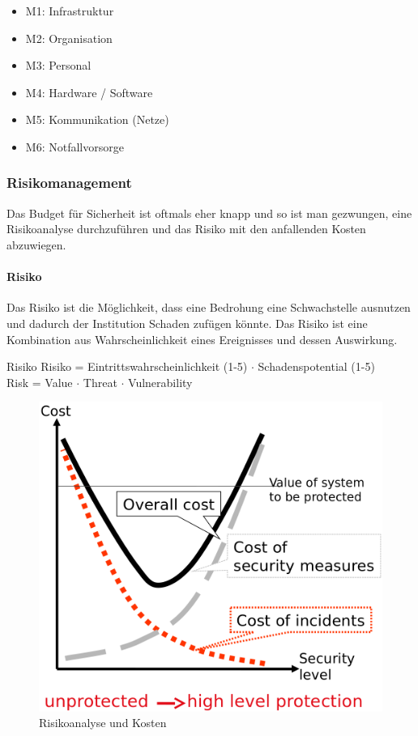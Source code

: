 \begin{itemize}
	\item M1: Infrastruktur
	\item M2: Organisation
	\item M3: Personal
	\item M4: Hardware / Software
	\item M5: Kommunikation (Netze)
	\item M6: Notfallvorsorge
\end{itemize}

\subsubsection{Risikomanagement}

Das Budget für Sicherheit ist oftmals eher knapp und so ist man gezwungen, eine Risikoanalyse durchzuführen und das Risiko mit den anfallenden Kosten abzuwiegen.

\paragraph{Risiko} 

Das Risiko ist die Möglichkeit, dass eine Bedrohung eine Schwachstelle ausnutzen und dadurch der Institution Schaden zufügen könnte. Das Risiko ist eine Kombination aus Wahrscheinlichkeit eines Ereignisses und dessen Auswirkung. 


\begin{remember}{Risiko}{}
	Risiko = Eintrittswahrscheinlichkeit (1-5) $\cdot$ Schadenspotential (1-5) \\
	Risk = Value $\cdot$ Threat $\cdot$ Vulnerability
\end{remember}

\begin{figure}[h!]
	\centering
	\includegraphics[width=0.5\linewidth]{images/ims_cost}
	\caption{Risikoanalyse und Kosten}
	\label{fig:imscost}
\end{figure}

